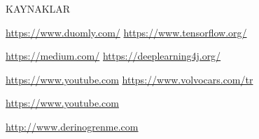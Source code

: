 \documentclass{beamer}                                                                                          %
\begin{document}
    \begin{frame}{KAYNAKLAR}

        \color{myred1} \color{black} \href{https://www.duomly.com/}{https://www.duomly.com/}\hspace{32}\color{myred1} \color{black} \href{https://www.tensorflow.org/}{https://www.tensorflow.org/}\par \vspace{15}
        
        
        \color{myred1} \color{black} \href{https://medium.com/}{https://medium.com/}\hspace{53}\color{myred1} \color{black} \href{https://deeplearning4j.org/}{https://deeplearning4j.org/}\par \vspace{15}
        
        
        \color{myred1} \color{black} \href{https://www.youtube.com/watch?v=qk1RjRLIAq4&t=1012s}{https://www.youtube.com}\hspace{30}
        \color{myred1} \color{black} \href{https://www.volvocars.com/tr}{https://www.volvocars.com/tr}\par \vspace{15}
        
        
        \color{myred1} \color{black} \href{https://www.youtube.com/channel/UCkkgrhDCJheXQNIFqUVw0_g}{https://www.youtube.com}\par \vspace{15}
        \color{myred1} \color{black} \href{http://www.derinogrenme.com}{http://www.derinogrenme.com}\par \vspace{15}
        
        

\end{frame}
\end{document}
